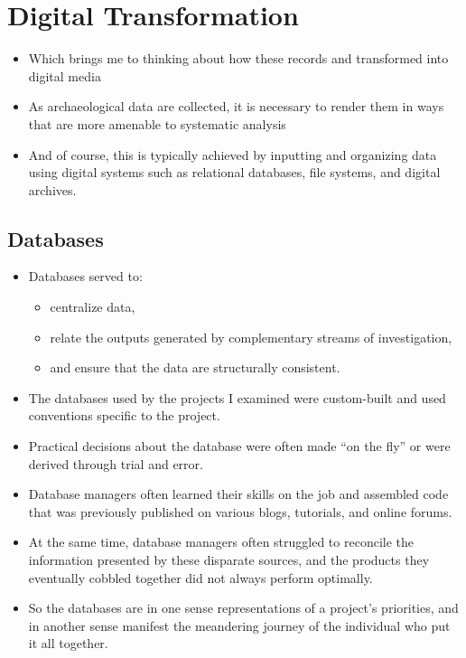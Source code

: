 \documentclass{article}
\begin{document}
\section{Digital Transformation}
\begin{itemize}
  \item Which brings me to thinking about how these records and transformed into digital media
  
  \item As archaeological data are collected, it is necessary to render them in ways that are more amenable to systematic analysis

  \item And of course, this is typically achieved by inputting and organizing data using digital systems such as relational databases, file systems, and digital archives.
\end{itemize}

\subsection{Databases}
\begin{itemize}
  \item Databases served to:
  \begin{itemize}
    \item centralize data,
    \item relate the outputs generated by complementary streams of investigation,
    \item and ensure that the data are structurally consistent.
  \end{itemize}\vspace{1em}

  \item The databases used by the projects I examined were custom-built and used conventions specific to the project.
  \item Practical decisions about the database were often made ``on the fly'' or were derived through trial and error.
  \item Database managers often learned their skills on the job and assembled code that was previously published on various blogs, tutorials, and online forums.\\
  
  \item At the same time, database managers often struggled to reconcile the information presented by these disparate sources, and the products they eventually cobbled together did not always perform optimally.\\
  
  \item So the databases are in one sense representations of a project's priorities, and in another sense manifest the meandering journey of the individual who put it all together.
\end{itemize}
\end{document}
